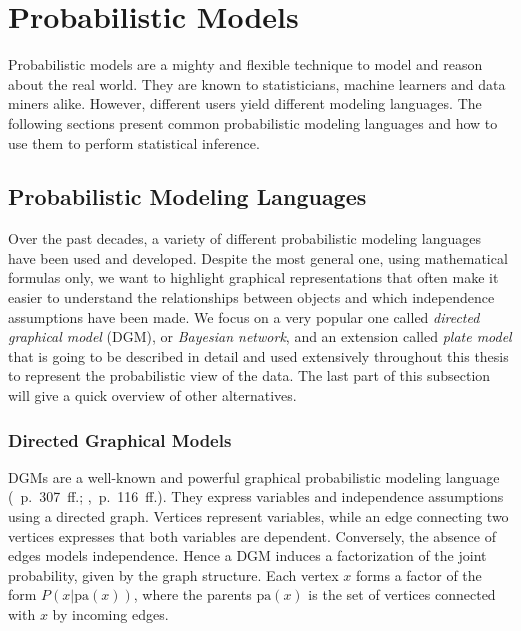 \section{Probabilistic Models}

Probabilistic models are a mighty and flexible technique to model and reason about the real world. They are known to statisticians, machine learners and data miners alike. However, different users yield different modeling languages. The following sections present common probabilistic modeling languages and how to use them to perform statistical inference.

\subsection{Probabilistic Modeling Languages}

Over the past decades, a variety of different probabilistic modeling languages have been used and developed. Despite the most general one, using mathematical formulas only, we want to highlight graphical representations that often make it easier to understand the relationships between objects and which independence assumptions have been made. We focus on a very popular one called \emph{directed graphical model} (DGM), or \emph{Bayesian network}, and an extension called \emph{plate model} that is going to be described in detail and used extensively throughout this thesis to represent the probabilistic view of the data. The last part of this subsection will give a quick overview of other alternatives.

\subsubsection{Directed Graphical Models} %

DGMs are a well-known and powerful graphical probabilistic modeling language (\cite{murphy2012machine}~p.~307~ff.; \cite{pearl1988probabilistic},~p.~116~ff.). They express variables and independence assumptions using a directed graph. Vertices represent variables, while an edge connecting two vertices expresses that both variables are dependent. Conversely, the absence of edges models independence. Hence a DGM induces a factorization of the joint probability, given by the graph structure. Each vertex $x$ forms a factor of the form $P\left(x|\text{pa}(x)\right)$, where the parents $\text{pa}(x)$ is the set of vertices connected with $x$ by incoming edges.

